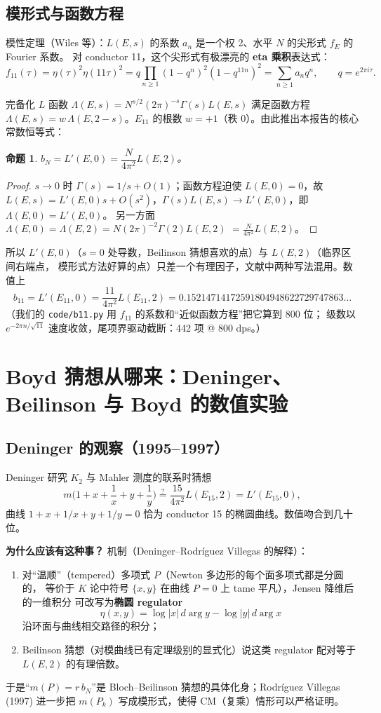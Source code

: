 \documentclass[11pt,a4paper]{ctexart}
\newtheorem{proposition}[theorem]{命题}
\theoremstyle{remark}
\newcommand{\EE}{E_{11}}
\newcommand{\bN}{b_{11}}
\newcommand{\dd}{\,d}
\begin{document}
\subsection{模形式与函数方程}

模性定理（Wiles 等）：$L(E,s)$ 的系数 $a_n$ 是一个权 2、水平 $N$ 的尖形式 $f_E$ 的 Fourier 系数。
对 conductor 11，这个尖形式有极漂亮的 \textbf{eta 乘积}表达式：
\[
f_{11}(\tau)=\eta(\tau)^2\eta(11\tau)^2=q\prod_{n\ge1}(1-q^n)^2(1-q^{11n})^2=\sum_{n\ge1}a_nq^n,
\qquad q=e^{2\pi i\tau}.
\]

完备化 $L$ 函数 $\Lambda(E,s)=N^{s/2}(2\pi)^{-s}\Gamma(s)L(E,s)$ 满足函数方程
$\Lambda(E,s)=w\,\Lambda(E,2-s)$。$E_{11}$ 的根数 $w=+1$（秩 0）。由此推出本报告的核心常数恒等式：

\begin{proposition}
$b_N=L'(E,0)=\dfrac{N}{4\pi^2}L(E,2)$。
\end{proposition}
\begin{proof}
$s\to0$ 时 $\Gamma(s)=1/s+O(1)$；函数方程迫使 $L(E,0)=0$，故
$L(E,s)=L'(E,0)s+O(s^2)$，$\Gamma(s)L(E,s)\to L'(E,0)$，即 $\Lambda(E,0)=L'(E,0)$。
另一方面 $\Lambda(E,0)=\Lambda(E,2)=N(2\pi)^{-2}\Gamma(2)L(E,2)$ $=\frac{N}{4\pi^2}L(E,2)$。
\end{proof}

所以 $L'(E,0)$（$s=0$ 处导数，Beilinson 猜想喜欢的点）与 $L(E,2)$（临界区间右端点，
模形式方法好算的点）只差一个有理因子，文献中两种写法混用。数值上
\[
\bN=L'(\EE,0)=\frac{11}{4\pi^2}L(\EE,2)=0.15214714172591804948622729747863\ldots
\]
（我们的 \texttt{code/b11.py} 用 $f_{11}$ 的系数和“近似函数方程”把它算到 800 位；
级数以 $e^{-2\pi n/\sqrt{11}}$ 速度收敛，尾项界驱动截断：442 项 @ 800 dps。）

\section{Boyd 猜想从哪来：Deninger、Beilinson 与 Boyd 的数值实验}

\subsection{Deninger 的观察（1995--1997）}

Deninger 研究 $K_2$ 与 Mahler 测度的联系时猜想
\[
m\Big(1+x+\frac1x+y+\frac1y\Big)\stackrel?=\frac{15}{4\pi^2}L(E_{15},2)=L'(E_{15},0),
\]
曲线 $1+x+1/x+y+1/y=0$ 恰为 conductor 15 的椭圆曲线。数值吻合到几十位。

\textbf{为什么应该有这种事？} 机制（Deninger--Rodr\'iguez Villegas 的解释）：
\begin{enumerate}[nosep]
\item 对“温顺”（tempered）多项式 $P$（Newton 多边形的每个面多项式都是分圆的，
等价于 $K$ 论中符号 $\{x,y\}$ 在曲线 $P=0$ 上 tame 平凡），Jensen 降维后的一维积分
可改写为\textbf{椭圆 regulator}
\[
\eta(x,y)=\log|x|\dd\arg y-\log|y|\dd\arg x
\]
沿环面与曲线相交路径的积分；
\item Beilinson 猜想（对模曲线已有定理级别的显式化）说这类 regulator 配对等于
$L(E,2)$ 的有理倍数。
\end{enumerate}
于是“$m(P)=r\,b_N$”是 Bloch--Beilinson 猜想的具体化身；Rodr\'iguez Villegas (1997)
进一步把 $m(P_k)$ 写成模形式，使得 CM（复乘）情形可以严格证明。
\end{document}
